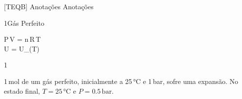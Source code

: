 \documentclass[\mainfilename]{subfiles}
\begin{document}
[TEQB]
{Anotações}
{Anotações}

\renewcommand\thequestion{Questão 1\,--\,\arabic{question}}
\renewcommand\thesubquestion{Q1\,--\,\arabic{question} \alph{subquestion})}

\begin{sectionBox}1{Gás Perfeito}
    
    \begin{BM}
        P\,V = n\,R\,T
        \\
        U = U_{(T)}
    \end{BM}
    
\end{sectionBox}

\begin{questionBox}1{}
    
    1\,\unit{\mole} de um gás perfeito, inicialmente a 25\,\unit{\celsius} e 1\,\unit{\bar}, sofre uma expansão. No estado final, \(T = 25\,\unit{\celsius}\) e \(P = 0.5\,\unit{\bar}\).

\end{questionBox}
\end{document}
